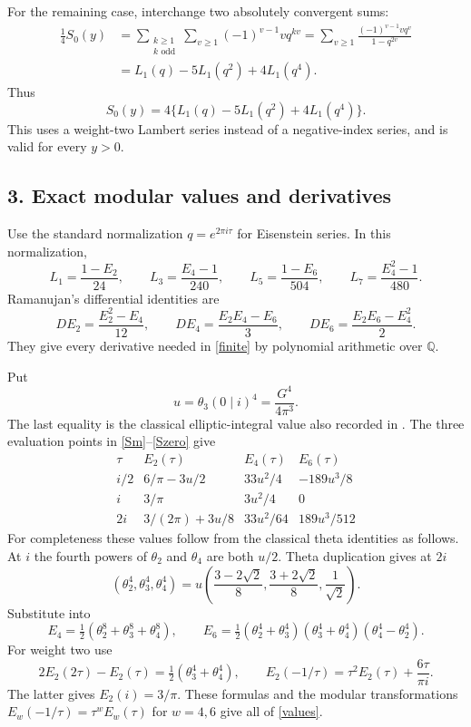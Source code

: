 \documentclass[11pt]{article}
\newcommand{\Q}{\mathbb Q}
\begin{document}
For the remaining case, interchange two absolutely convergent sums:
\begin{align*}
 \frac14 S_0(y)
 &=\sum_{\substack{k\ge1\\k\text{ odd}}}
       \sum_{v\ge1}(-1)^{v-1}v q^{kv}
   =\sum_{v\ge1}\frac{(-1)^{v-1}v q^v}{1-q^{2v}}\\
 &=L_1(q)-5L_1(q^2)+4L_1(q^4).
\end{align*}
Thus
\begin{equation}\label{Szero}
 S_0(y)=4\{L_1(q)-5L_1(q^2)+4L_1(q^4)\}.
\end{equation}
This uses a weight-two Lambert series instead of a negative-index
series, and is valid for every $y>0$.

\subsection*{3. Exact modular values and derivatives}
Use the standard normalization $q=e^{2\pi i\tau}$ for Eisenstein
series. In this normalization,
\[
 L_1=\frac{1-E_2}{24},\qquad
 L_3=\frac{E_4-1}{240},\qquad
 L_5=\frac{1-E_6}{504},\qquad
 L_7=\frac{E_4^2-1}{480}.
\]
Ramanujan's differential identities \cite[Section 7]{R} are
\begin{equation}\label{ramanujan}
 DE_2=\frac{E_2^2-E_4}{12},\qquad
 DE_4=\frac{E_2E_4-E_6}{3},\qquad
 DE_6=\frac{E_2E_6-E_4^2}{2}.
\end{equation}
They give every derivative needed in \eqref{finite} by polynomial
arithmetic over $\Q$.

Put
\[
 u=\theta_3(0\mid i)^4=\frac{G^4}{4\pi^3}.
\]
The last equality is the classical elliptic-integral value also
recorded in \cite[equation (2.3)]{XZ}. The three evaluation points
in \eqref{Sm}--\eqref{Szero} give
\begin{equation}\label{values}
\begin{array}{c|ccc}
\tau&E_2(\tau)&E_4(\tau)&E_6(\tau)\\ \hline
i/2&6/\pi-3u/2&33u^2/4&-189u^3/8\\
i&3/\pi&3u^2/4&0\\
2i&3/(2\pi)+3u/8&33u^2/64&189u^3/512
\end{array}
\end{equation}
For completeness these values follow from the classical theta
identities as follows. At $i$ the fourth powers of $\theta_2$ and
$\theta_4$ are both $u/2$. Theta duplication \cite{DLMF} gives at $2i$
\[
 (\theta_2^4,\theta_3^4,\theta_4^4)
   =u\left(\frac{3-2\sqrt2}{8},
           \frac{3+2\sqrt2}{8},\frac1{\sqrt2}\right).
\]
Substitute into
\[
 E_4=\tfrac12(\theta_2^8+\theta_3^8+\theta_4^8),\qquad
 E_6=\tfrac12(\theta_2^4+\theta_3^4)
                  (\theta_3^4+\theta_4^4)(\theta_4^4-\theta_2^4).
\]
For weight two use
\[
 2E_2(2\tau)-E_2(\tau)=\tfrac12(\theta_3^4+\theta_4^4),\qquad
 E_2(-1/\tau)=\tau^2E_2(\tau)+\frac{6\tau}{\pi i}.
\]
The latter gives $E_2(i)=3/\pi$. These formulas and the modular
transformations $E_w(-1/\tau)=\tau^wE_w(\tau)$ for $w=4,6$
give all of \eqref{values}.
\end{document}
